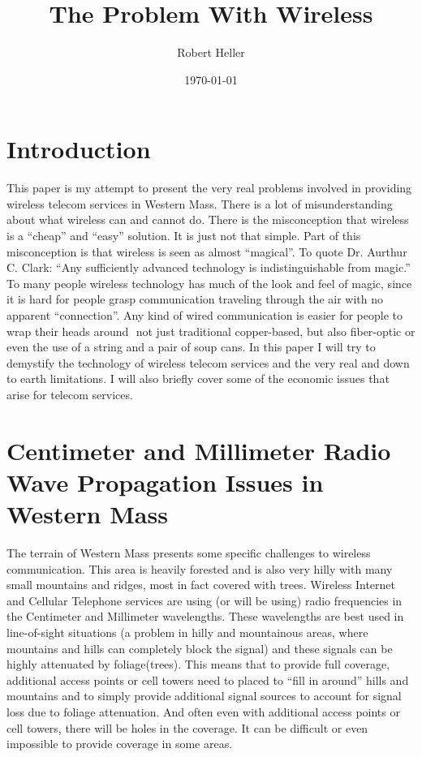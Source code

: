 \documentclass[12pt]{article}
\title{The Problem With Wireless}
\author{Robert Heller}
\date{\today}
\begin{document}
\maketitle

\tableofcontents


\section{Introduction}

















This paper is my attempt to present the very real problems involved in
providing wireless telecom services in Western Mass. There is a lot of
misunderstanding about what wireless can and cannot do. There is the
misconception that wireless is a ``cheap'' and ``easy'' solution. It is just
not that simple. Part of this misconception is that wireless is seen as almost
``magical''. To quote Dr. Aurthur C. Clark: ``Any sufficiently advanced
technology is indistinguishable from magic.'' To many people wireless
technology has much of the look and feel of magic, since it is hard for people
grasp communication traveling through the air with no apparent ``connection''.
Any kind of wired communication is easier for people to wrap their heads
around ­ not just traditional copper-based, but also fiber-optic or even the
use of a string and a pair of soup cans. In this paper I will try to demystify
the technology of wireless telecom services and the very real and down to
earth limitations. I will also briefly cover some of the economic issues that
arise for telecom services.


\section{Centimeter and Millimeter Radio Wave Propagation Issues in Western Mass}

The terrain of Western Mass presents some specific challenges to wireless
communication. This area is heavily forested and is also very hilly with many
small mountains and ridges, most in fact covered with trees. Wireless Internet
and Cellular Telephone services are using (or will be using) radio frequencies
in the Centimeter and Millimeter wavelengths. These wavelengths are best used
in line-of-sight situations (a problem in hilly and mountainous areas, where
mountains and hills can completely block the signal) and these signals can be
highly attenuated by foliage(trees)\cite{Effect.IJCA.0975-8887}. This means
that to provide full coverage, additional access points or cell towers need to
placed to ``fill in around'' hills and mountains and to simply provide
additional signal sources to account for signal loss due to foliage
attenuation. And often even with additional access points or cell towers,
there will be holes in the coverage. It can be difficult or even impossible to
provide coverage in some areas.
\end{document}
